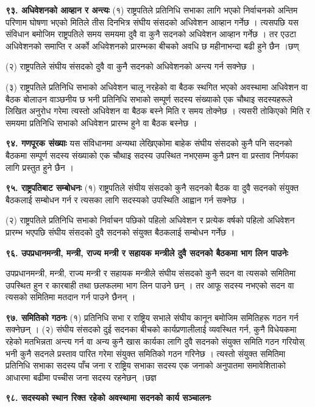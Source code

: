 \textbf{९३. अधिवेशनको आव्हान र अन्त्यः} (१) राष्ट्रपतिले प्रतिनिधि सभाका लागि भएको निर्वाचनको अन्तिम परिणाम घोषणा भएको मितिले तीस दिनभित्र संघीय संसदको अधिवेशन आव्हान गर्नेछ । त्यसपछि यस संविधान बमोजिम राष्ट्रपतिले समय समयमा दुवै वा कुनै सदनको अधिवेशन आव्हान गर्नेछ । तर एउटा अधिवेशनको समाप्ति र अर्को अधिवेशनको प्रारम्भका बीचको अवधि छ महीनाभन्दा बढी हुने छैन ।छण्

(२) राष्ट्रपतिले संघीय संसदको दुवै वा कुनै सदनको अधिवेशनको अन्त्य गर्न सक्नेछ ।

(३) राष्ट्रपतिले प्रतिनिधि सभाको अधिवेशन चालू नरहेको वा बैठक स्थगित भएको अवस्थामा अधिवेशन वा बैठक बोलाउन वाञ्छनीय छ भनी प्रतिनिधि सभाको सम्पूर्ण सदस्य संख्याको एक चौथाइ सदस्यहरूले लिखित अनुरोध गरेमा त्यस्तो अधिवेशन वा बैठक बस्ने मिति र समय तोक्नेछ । त्यसरी तोकिएको मिति र समयमा प्रतिनिधि सभाको अधिवेशन प्रारम्भ हुने वा बैठक बस्नेछ ।

\textbf{९४. गणपूरक संख्याः} यस संविधानमा अन्यथा लेखिएकोमा बाहेक संघीय संसदको कुनै पनि सदनको बैठकमा सम्पूर्ण सदस्य संख्याको एक चौथाइ सदस्य उपस्थित नभएसम्म कुनै प्रश्न वा प्रस्ताव निर्णयका लागि प्रस्तुत हुने छैन ।

\textbf{९५. राष्ट्रपतिबाट सम्बोधनः} (१) राष्ट्रपतिले संघीय संसदको कुनै सदनको बैठक वा दुवै सदनको संयुक्त बैठकलाई सम्बोधन गर्न र त्यसका लागि सदस्यको उपस्थिति आह्वान गर्न सक्नेछ ।

(२) राष्ट्रपतिले प्रतिनिधि सभाको निर्वाचन पछिको पहिलो अधिवेशन र प्रत्येक वर्षको पहिलो अधिवेशन प्रारम्भ भएपछि संघीय संसदको दुवै सदनको संयुक्त बैठकलाई सम्बोधन गर्नेछ ।

\textbf{९६. उपप्रधानमन्त्री, मन्त्री, राज्य मन्त्री र सहायक मन्त्रीले दुवै सदनको बैठकमा भाग लिन पाउनेः}

उपप्रधानमन्त्री, मन्त्री, राज्य मन्त्री र सहायक मन्त्रीले संघीय संसदको कुनै सदन वा त्यसको समितिमा उपस्थित हुन र कारबाही
तथा छलफलमा भाग लिन पाउने छन् । तर आफू सदस्य नभएको सदन वा त्यसको समितिमा मतदान गर्न पाउने छैनन् ।

\textbf{९७. समितिको गठनः} (१) प्रतिनिधि सभा र राष्ट्रिय सभाले संघीय कानून बमोजिम समितिहरू गठन गर्न सक्नेछन् ।
(२) संघीय संसदको दुई सदनका बीचको कार्यप्रणालीलाई व्यवस्थित गर्न, कुनै विधेयकमा रहेको मतभिन्नता अन्त्य गर्न वा अन्य कुनै खास
कार्यका लागि दुवै सदनको संयुक्त समिति गठन गरियोस् भनी कुनै सदनले प्रस्ताव पारित गरेमा संयुक्त समितिको गठन गरिनेछ । त्यस्तो संयुक्त समितिमा प्रतिनिधि सभाका सदस्य पाँच जना र राष्ट्रिय सभाका सदस्य एक जनाको अनुपातमा समावेशिताको आधारमा बढीमा पच्चीस जना सदस्य रहनेछन् ।छज्ञ

\textbf{९८. सदस्यको स्थान रिक्त रहेको अवस्थामा सदनको कार्य सञ्चालनः}

